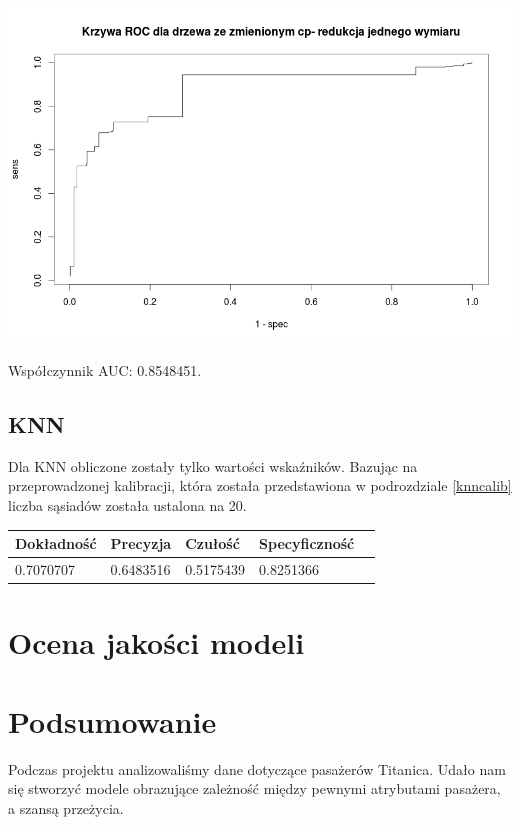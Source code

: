 \documentclass{article}
\begin{document}
\begin{center}
	\includegraphics[scale=0.40]{images/cptree2.png}
\end{center}

Współczynnik AUC: 0.8548451.

\subsection{KNN}

Dla KNN obliczone zostały tylko wartości wskaźników. Bazując na przeprowadzonej kalibracji, która została przedstawiona w podrozdziale \ref{knncalib} liczba sąsiadów została ustalona na 20.\\

\begin{center}
    \begin{tabular}{| l | l | l | l | l|}
    \hline
        Dokładność &  Precyzja &  Czułość & Specyficzność \\ \hline
      	0.7070707 & 0.6483516 & 0.5175439 & 0.8251366  \\
    \hline
    \end{tabular}
\end{center}

\section{Ocena jakości modeli}
\section{Podsumowanie}
Podczas projektu analizowaliśmy dane dotyczące pasażerów Titanica. Udało nam się stworzyć modele obrazujące zależność między pewnymi atrybutami pasażera, a szansą przeżycia.
\end{document}
